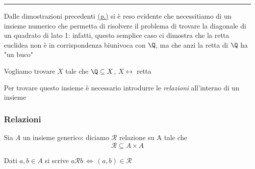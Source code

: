 \rule{7em}{.4pt}

Dalle dimostrazioni precedenti \hyperref[prp:sdfsdfsdfdd]{(\textit{p}.)} si è reso evidente che necessitiamo di un insieme numerico che permetta di risolvere il problema di trovare la diagonale di un quadrato di lato 1: infatti, questo semplice caso ci dimostra che la retta euclidea non è in corrispondenza biunivoca con $ \Q $, ma che anzi la retta di $ \Q $ ha "un buco"

Vogliamo trovare $ X $ tale che $ \Q \subseteq X $, $ X \leftrightarrow $ retta

Per trovare questo insieme è necessario introdurre le \textit{relazioni} all'interno di un insieme

\subsubsection{Relazioni}

Sia $ A $ un insieme generico: diciamo $ \mathcal{R}  $ relazione su A tale che \[
    \mathcal{R} \subseteq A\times A
\]

Dati $ a, b \in A $ si scrive $ a\mathcal{R}b \,\iff\, (a, b) \in \mathcal{R} $



